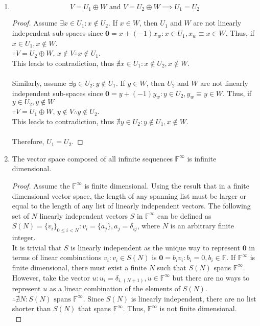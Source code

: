 \begin{sol}
\begin{enumerate}[label=\textbf{(\alph*)}]
\item
\begin{theorem}
\begin{equation}
	V=U_1\oplus W \text{ and }V=U_2\oplus W\implies U_1=U_2
\end{equation}
\end{theorem}
\begin{proof}
Assume $\exists x\in U_1: x\notin U_2$. If $x\in W$, then $U_1$ and $W$ are not linearly independent sub-spaces since $\mathbf 0= x+(-1)x_w:x\in U_1,x_w\equiv x\in W$. Thus, if $x\in U_1, x\notin W$. \\
$\because V=U_2\oplus W$, $x\notin V\therefore x\notin U_1$.\\
This leads to contradiction, thus $\nexists x\in U_1: x\notin U_2, x\notin W$.\\\\
Similarly, assume $\exists y\in U_2:y\notin U_1$. If $y\in W$, then $U_2$ and $W$ are not linearly independent sub-spaces since $\mathbf 0= y+(-1)y_w:y\in U_2,y_w\equiv y\in W$. Thus, if $y\in U_2, y\notin W$\\
$\because V=U_1\oplus W$, $y\notin V\therefore y\notin U_2$.\\
This leads to contradiction, thus $\nexists y\in U_2: y\notin U_1, x\notin W$.\\\\
Therefore, $U_1=U_2$.
\end{proof}
\item
\begin{theorem}
The vector space composed of all infinite sequences $\mathbb F^\infty$ is infinite dimensional. 
\end{theorem}
\begin{proof}
Assume the $\mathbb F^\infty$ is finite dimensional. Using the result that in a finite dimensional vector space, the length of any spanning list must be larger or equal to the length of any list of linearly independent vectors. The following set of $N$ linearly independent vectors $S$ in $\mathbb F^\infty$ can be defined as $S(N)=\{v_i\}_{0\leq i<N}: v_i=\{a_j\}, a_j=\delta_{ij}$, where $N$ is an arbitrary finite integer. \\
It is trivial that $S$ is linearly independent as the unique way to represent $\textbf{0}$ in terms of linear combinations $v_i:v_i\in S(N)$ is $\mathbf 0=b_iv_i: b_i=0, b_i\in\mathbb F$.  If $\mathbb F^\infty$ is finite dimensional, there must exist a finite $N$ such that $S(N)$ spans $\mathbb F^\infty$. However, take the vector $u:u_i=\delta_{i,(N+1)}, u\in \mathbb F^\infty$ but there are no ways to represent $u$ as a linear combination of the elements of $S(N)$. $\therefore\nexists N:S(N)\text{ spans }\mathbb F^\infty$. Since $S(N)$ is linearly independent, there are no list shorter than $S(N)$ that spans $\mathbb F^\infty$. Thus, $\mathbb F^\infty$ is not finite dimensional.\\

\end{proof}
\end{enumerate}
\end{sol}
